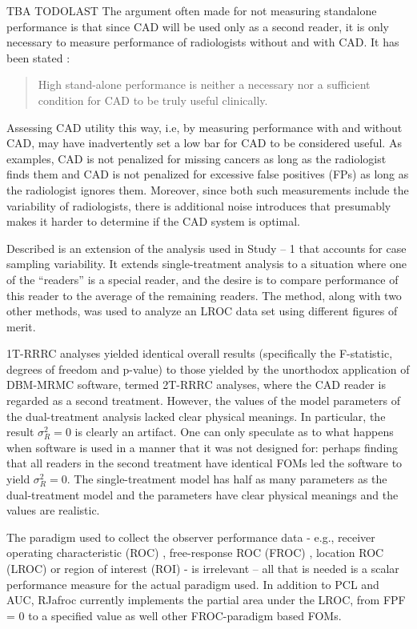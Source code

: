 \documentclass[
]{book}
\begin{document}
TBA TODOLAST The argument often made for not measuring standalone performance is that since CAD will be used only as a second reader, it is only necessary to measure performance of radiologists without and with CAD. It has been stated \citep{nishikawa2011fundamental}:

\begin{quote}
High stand-alone performance is neither a necessary nor a sufficient condition for CAD to be truly useful clinically.
\end{quote}

Assessing CAD utility this way, i.e, by measuring performance with and without CAD, may have inadvertently set a low bar for CAD to be considered useful. As examples, CAD is not penalized for missing cancers as long as the radiologist finds them and CAD is not penalized for excessive false positives (FPs) as long as the radiologist ignores them. Moreover, since both such measurements include the variability of radiologists, there is additional noise introduces that presumably makes it harder to determine if the CAD system is optimal.

Described is an extension of the analysis used in Study -- 1 that accounts for case sampling variability. It extends \citep{hillis2005comparison} single-treatment analysis to a situation where one of the ``readers'' is a special reader, and the desire is to compare performance of this reader to the average of the remaining readers. The method, along with two other methods, was used to analyze an LROC data set using different figures of merit.

1T-RRRC analyses yielded identical overall results (specifically the F-statistic, degrees of freedom and p-value) to those yielded by the unorthodox application of DBM-MRMC software, termed 2T-RRRC analyses, where the CAD reader is regarded as a second treatment. However, the values of the model parameters of the dual-treatment analysis lacked clear physical meanings. In particular, the result \(\sigma_R^2 = 0\) is clearly an artifact. One can only speculate as to what happens when software is used in a manner that it was not designed for: perhaps finding that all readers in the second treatment have identical FOMs led the software to yield \(\sigma_R^2 = 0\). The single-treatment model has half as many parameters as the dual-treatment model and the parameters have clear physical meanings and the values are realistic.

The paradigm used to collect the observer performance data - e.g., receiver operating characteristic (ROC) \citep{metz1986rocmethodology}, free-response ROC (FROC) \citep{Chakraborty1986DigitalVsConv}, location ROC (LROC) \citep{starr1975visual} or region of interest (ROI) \citep{obuchowski2010data} - is irrelevant -- all that is needed is a scalar performance measure for the actual paradigm used. In addition to PCL and AUC, RJafroc currently implements the partial area under the LROC, from FPF = 0 to a specified value as well other FROC-paradigm based FOMs.
\end{document}
